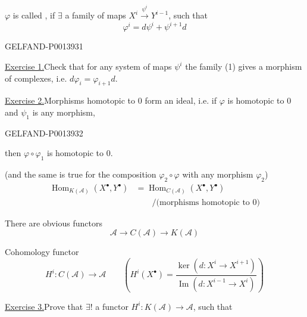 \(\varphi\) is called , if
\(\exists\) a family of maps \(X^i\overset{\psi^i}{\longrightarrow}Y^{i-1}\),
such that
\begin{equation*}
\varphi^i=d\psi^i+\psi^{i+1}d
\tag{1}
\end{equation*}


\begin{GelfandAdjacentEvidence}{GELFAND-P001393}{1}

\uline{Exercise 1.}\quad Check that for any system of maps \(\psi^i\) the family (1)
gives a morphism of complexes, i.e. \(d\varphi_i=\varphi_{i+1}d\).

\uline{Exercise 2.}\quad Morphisms homotopic to \(0\) form an ideal, i.e. if
\(\varphi\) is homotopic to \(0\) and \(\psi_1\) is any morphism,
\end{GelfandAdjacentEvidence}
\begin{GelfandAdjacentEvidence}{GELFAND-P001393}{2}

then \(\varphi\circ\varphi_1\) is homotopic to \(0\).

(and the same is true for the composition \(\varphi_2\circ\varphi\) with any morphism \(\varphi_2\))
\[
\begin{aligned}
\operatorname{Hom}_{K(\mathcal A)}(X^\bullet,Y^\bullet)
&=\operatorname{Hom}_{C(\mathcal A)}(X^\bullet,Y^\bullet)\\
&\qquad /\bigl(\text{morphisms homotopic to }0\bigr)
\end{aligned}
\]

There are obvious functors
\[
\mathcal A\longrightarrow C(\mathcal A)\longrightarrow K(\mathcal A)
\]

Cohomology functor
\[
H^i\colon C(\mathcal A)\longrightarrow\mathcal A\qquad
\left(H^i(X^\bullet)=
\frac{\ker(d\colon X^i\longrightarrow X^{i+1})}
{\operatorname{Im}(d\colon X^{i-1}\longrightarrow X^i)}\right)
\]

\uline{Exercise 3.}\quad Prove that \(\exists!\) a functor
\(H^i\colon K(\mathcal A)\longrightarrow\mathcal A\), such that
\end{GelfandAdjacentEvidence}

